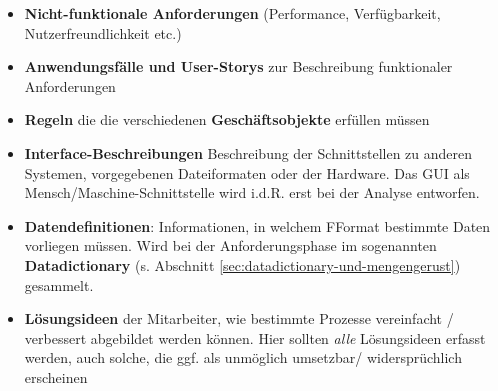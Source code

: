 \begin{itemize}
    \item \textbf{Nicht-funktionale Anforderungen} (Performance, Verfügbarkeit, Nutzerfreundlichkeit etc.)
    \item \textbf{Anwendungsfälle und User-Storys} zur Beschreibung funktionaler Anforderungen
    \item \textbf{Regeln} die die verschiedenen \textbf{Geschäftsobjekte} erfüllen müssen
    \item \textbf{Interface-Beschreibungen} Beschreibung der Schnittstellen zu anderen Systemen, vorgegebenen Dateiformaten oder der Hardware.
    Das GUI als Mensch/Maschine-Schnittstelle wird i.d.R. erst bei der Analyse entworfen.
    \item \textbf{Datendefinitionen}: Informationen, in welchem FFormat bestimmte Daten vorliegen müssen.
    Wird bei der Anforderungsphase im sogenannten \textbf{Datadictionary} (s. Abschnitt \ref{sec:datadictionary-und-mengengerust}) gesammelt.
    \item \textbf{Lösungsideen} der Mitarbeiter, wie bestimmte Prozesse vereinfacht / verbessert abgebildet werden können.
    Hier sollten \textit{alle} Lösungsideen erfasst werden, auch solche, die ggf. als unmöglich umsetzbar/ widersprüchlich erscheinen
\end{itemize}

